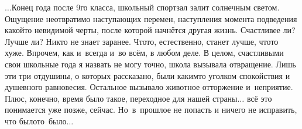 $\ldots$Конец года после 9\sdash го класса, школьный спортзал залит солнечным светом. Ощущение неотвратимо наступающих перемен, наступления момента подведения какой\sdash то невидимой черты, после которой начнётся другая жизнь. Счастливее ли? Лучше ли? Никто не знает заранее. Что\sdash то, естественно, станет лучше, что\sdash то хуже. Впрочем, как и~всегда и~во всём, в любом деле. В целом, счастливыми свои школьные года я назвать не могу точно, школа вызывала отвращение. Лишь эти три отдушины, о которых рассказано, были каким\sdash то уголком спокойствия и душевного равновесия. Остальное вызывало животное отторжение и~неприятие. Плюс, конечно, время было такое, переходное для нашей страны$\ldots$ всё это понимается уже позже, сейчас. Но~в~прошлое не попасть и ничего не исправить, что было\mdash то~было$\ldots$  

\begin{center}
\end{center}